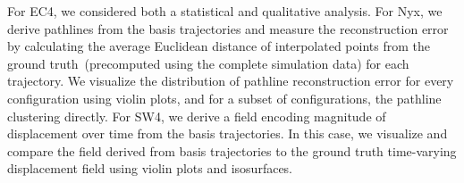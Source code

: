 For EC4, we considered both a statistical and qualitative analysis. 
%
For Nyx, we derive pathlines from the basis trajectories and measure the reconstruction error by calculating the average Euclidean distance of interpolated points from the ground truth~(precomputed using the complete simulation data) for each trajectory.
%
We visualize the distribution of pathline reconstruction error for every configuration using violin plots, and for a subset of configurations, the pathline clustering directly.
%
For SW4, we derive a field encoding magnitude of displacement over time from the basis trajectories.
%
In this case, we visualize and compare the field derived from basis trajectories to the ground truth time-varying displacement field using violin plots and isosurfaces.
%
%
%
%
%
%
%

